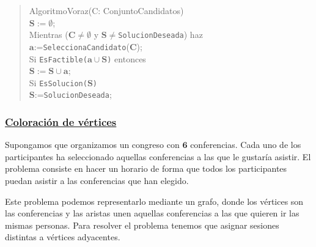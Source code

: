 \documentclass[twoside]{report}
\newcommand{\bs}[1]{\boldsymbol{#1}}
\begin{document}
        \begin{quotation}
        AlgoritmoVoraz(C: ConjuntoCandidatos) \\[1ex]
        $\bs{S:=\emptyset}$; \\[1ex]
        \textsf{Mientras} ($\bs{C\neq\emptyset}$ \textsf{y} $\bs{S\neq}$\texttt{SolucionDeseada}) \textsf{haz} \\[1ex]
            \hspace*{1cm} $\bs{a}$:=\texttt{SeleccionaCandidato}($\bs{C}$); \\[1ex]
            \hspace*{1cm} \textsf{Si} \texttt{EsFactible($\bs{a\cup S}$)} \textsf{entonces} \\[1ex]
                \hspace*{2cm} $\bs{S:=S\cup a}$; \\[1ex]
                \hspace*{2cm} \textsf{Si} \texttt{EsSolucion($\bs{S}$)} \\[1ex]
                    \hspace*{3cm} $\bs{S}$:=\texttt{SolucionDeseada}; \\[1ex]
        \end{quotation}



\subsubsection{\underline{Coloración de vértices}}
\vspace{0.2cm}

Supongamos que organizamos un congreso con $\bs{6}$ conferencias. Cada uno de los participantes ha seleccionado aquellas conferencias a las que le
gustaría asistir. El problema consiste en hacer un horario de forma que todos los participantes puedan asistir a las conferencias que han elegido.
\vspace{0.2cm}

Este problema podemos representarlo mediante un grafo, donde los vértices son las conferencias y las aristas unen aquellas con\-fe\-ren\-cias a las que quieren ir las mismas personas. Para resolver el problema tenemos que asignar sesiones distintas a vértices adyacentes.
\end{document}
